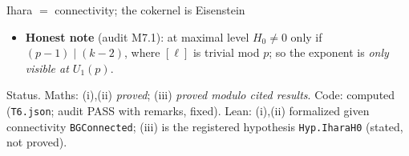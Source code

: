 \begin{frame}{Ihara $=$ connectivity; the cokernel is Eisenstein}
\begin{itemize}
      $(1+\ell)[\ell]^{-1}$ homologically; other cases undetermined.
    \item \textbf{Honest note} (audit M7.1): at maximal level $H_0\neq0$ only if $(p-1)\mid(k-2)$, where $[\ell]$ is trivial mod $p$; so the exponent is \emph{only visible at $U_1(p)$}.
  \end{itemize}
  \vfill
  {\tiny Status. Maths: (i),(ii) \emph{proved}; (iii) \emph{proved modulo cited results}. Code: computed (\texttt{T6.json}; audit PASS with remarks, fixed). Lean: (i),(ii) formalized given connectivity \texttt{BGConnected}; (iii) is the registered hypothesis \texttt{Hyp.IharaH0} (stated, not proved).}
\end{frame}
